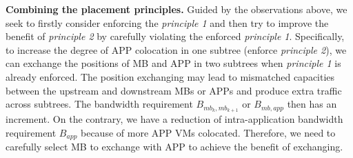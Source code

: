 \documentclass[review]{elsarticle}
\begin{document}
\textbf{Combining the placement principles.} Guided by the observations above, we seek to firstly consider enforcing the \emph{principle 1} and then try to improve the benefit of \emph{principle 2} by carefully violating the enforced \emph{principle 1}. Specifically, to increase the degree of APP colocation in one subtree (enforce \emph{principle 2}), we can exchange the positions of MB and APP in two subtrees when \emph{principle 1} is already enforced. %
The position exchanging may lead to mismatched capacities between the upstream and downstream MBs or APPs and produce extra traffic across subtrees. The bandwidth requirement $B_{mb_k,mb_{k+1}}$ or $B_{mb,app}$ then has an increment. On the contrary, we have a reduction of intra-application bandwidth requirement $B_{app}$ because of more APP VMs colocated. Therefore, we need to carefully select MB to exchange with APP to achieve the benefit of exchanging.
\end{document}
